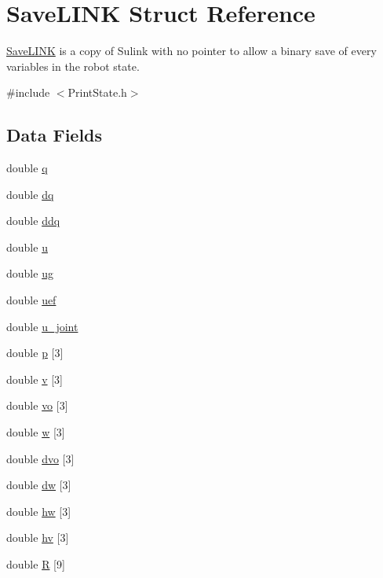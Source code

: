 \hypertarget{struct_save_l_i_n_k}{\section{Save\-L\-I\-N\-K Struct Reference}
\label{struct_save_l_i_n_k}
}


\hyperlink{struct_save_l_i_n_k}{Save\-L\-I\-N\-K} is a copy of Sulink with no pointer to allow a binary save of every variables in the robot state.  




{\ttfamily \#include $<$Print\-State.\-h$>$}

\subsection*{Data Fields}
\begin{DoxyCompactItemize}
\item 
double \hyperlink{struct_save_l_i_n_k_a5b5e3f03e443adea974601f295136638}{q}
\item 
double \hyperlink{struct_save_l_i_n_k_a7f417372d0026193269f02c43323b5b8}{dq}
\item 
double \hyperlink{struct_save_l_i_n_k_a63253863f0cf910e3b007c37de0e5ffd}{ddq}
\item 
double \hyperlink{struct_save_l_i_n_k_aed08c8478a62910aab06ba708a0e5b5f}{u}
\item 
double \hyperlink{struct_save_l_i_n_k_a26599157c0b45c8f13eb679ca9a2a491}{ug}
\item 
double \hyperlink{struct_save_l_i_n_k_a48e660e5c4e92e6b18ac669bf27e5972}{uef}
\item 
double \hyperlink{struct_save_l_i_n_k_a4c825b6298857a29278ccd8a7b731863}{u\-\_\-joint}
\item 
double \hyperlink{struct_save_l_i_n_k_a9f2a829150c5753f56e91e5e3d9f6677}{p} \mbox{[}3\mbox{]}
\item 
double \hyperlink{struct_save_l_i_n_k_ad8b2664bf7d7db7f9685845624616041}{v} \mbox{[}3\mbox{]}
\item 
double \hyperlink{struct_save_l_i_n_k_a5176e240065420f1a352ace313fc7f31}{vo} \mbox{[}3\mbox{]}
\item 
double \hyperlink{struct_save_l_i_n_k_a7c97a8f43de02c47555b4fcc74991b61}{w} \mbox{[}3\mbox{]}
\item 
double \hyperlink{struct_save_l_i_n_k_ad8cc15fc2d39656586d8ffa72dd2fa97}{dvo} \mbox{[}3\mbox{]}
\item 
double \hyperlink{struct_save_l_i_n_k_a9a93721b064a040498b5c08cd6ed014b}{dw} \mbox{[}3\mbox{]}
\item 
double \hyperlink{struct_save_l_i_n_k_a66047441f6f822ad4e7063f9bb4a4a3b}{hw} \mbox{[}3\mbox{]}
\item 
double \hyperlink{struct_save_l_i_n_k_a5b6e47bde4ca802c5f52ba814b4b3c1f}{hv} \mbox{[}3\mbox{]}
\item 
double \hyperlink{struct_save_l_i_n_k_ae9c91fd01a63a2b635a1796a4b713b86}{R} \mbox{[}9\mbox{]}
\end{DoxyCompactItemize}



